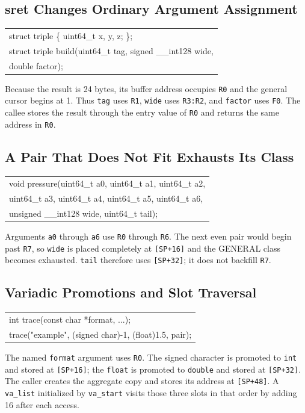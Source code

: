 \documentclass[10pt,twoside]{article}
\begin{document}
\subsection{sret Changes Ordinary Argument Assignment}
\begingroup\small\ttfamily
\begin{tabularx}{\linewidth}{@{}X@{}}
struct triple \{ uint64\_t x, y, z; \};\tabularnewline
struct triple build(uint64\_t tag, signed \_\_int128 wide,\tabularnewline
\hspace{1.2em}double factor);\tabularnewline
\end{tabularx}
\endgroup
Because the result is 24 bytes, its buffer address occupies \texttt{R0} and
the general cursor begins at 1. Thus \texttt{tag} uses \texttt{R1},
\texttt{wide} uses \texttt{R3:R2}, and \texttt{factor} uses \texttt{F0}.
The callee stores the result through the entry value of \texttt{R0} and returns
the same address in \texttt{R0}.

\subsection{A Pair That Does Not Fit Exhausts Its Class}
\begingroup\small\ttfamily
\begin{tabularx}{\linewidth}{@{}X@{}}
void pressure(uint64\_t a0, uint64\_t a1, uint64\_t a2,\tabularnewline
\hspace{1.2em}uint64\_t a3, uint64\_t a4, uint64\_t a5, uint64\_t a6,\tabularnewline
\hspace{1.2em}unsigned \_\_int128 wide, uint64\_t tail);\tabularnewline
\end{tabularx}
\endgroup
Arguments \texttt{a0} through \texttt{a6} use \texttt{R0} through
\texttt{R6}. The next even pair would begin past \texttt{R7}, so
\texttt{wide} is placed completely at \texttt{[SP+16]} and the GENERAL class
becomes exhausted. \texttt{tail} therefore uses \texttt{[SP+32]}; it does not
backfill \texttt{R7}.

\subsection{Variadic Promotions and Slot Traversal}
\begingroup\small\ttfamily
\begin{tabularx}{\linewidth}{@{}X@{}}
int trace(const char *format, ...);\tabularnewline
trace("example", (signed char)-1, (float)1.5, pair);\tabularnewline
\end{tabularx}
\endgroup
The named \texttt{format} argument uses \texttt{R0}. The signed character is
promoted to \texttt{int} and stored at \texttt{[SP+16]}; the \texttt{float} is
promoted to \texttt{double} and stored at \texttt{[SP+32]}. The caller creates
the aggregate copy and stores its address at \texttt{[SP+48]}. A
\texttt{va\_list} initialized by \texttt{va\_start} visits those three slots in
that order by adding 16 after each access.
\end{document}
